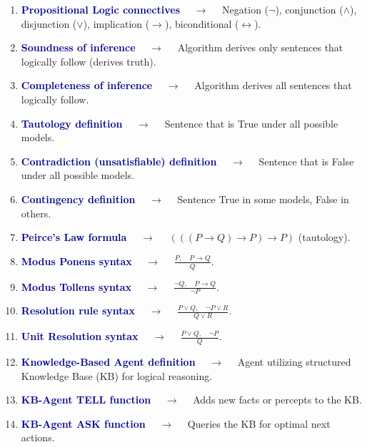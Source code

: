 \documentclass[11pt,a4paper]{article}
\begin{document}
\begin{enumerate}[label=\arabic*., leftmargin=*, labelsep=0.8em, itemsep=0.35em, parsep=0.1em, topsep=0.2em]
  \item \textcolor{darkblue}{\textbf{Propositional Logic connectives}} $\quad\to\quad$ Negation ($\neg$), conjunction ($\land$), disjunction ($\lor$), implication ($\rightarrow$), biconditional ($\leftrightarrow$).
  \item \textcolor{darkblue}{\textbf{Soundness of inference}} $\quad\to\quad$ Algorithm derives only sentences that logically follow (derives truth).
  \item \textcolor{darkblue}{\textbf{Completeness of inference}} $\quad\to\quad$ Algorithm derives all sentences that logically follow.
  \item \textcolor{darkblue}{\textbf{Tautology definition}} $\quad\to\quad$ Sentence that is True under all possible models.
  \item \textcolor{darkblue}{\textbf{Contradiction (unsatisfiable) definition}} $\quad\to\quad$ Sentence that is False under all possible models.
  \item \textcolor{darkblue}{\textbf{Contingency definition}} $\quad\to\quad$ Sentence True in some models, False in others.
  \item \textcolor{darkblue}{\textbf{Peirce's Law formula}} $\quad\to\quad$ $(((P \rightarrow Q) \rightarrow P) \rightarrow P)$ (tautology).
  \item \textcolor{darkblue}{\textbf{Modus Ponens syntax}} $\quad\to\quad$ $\frac{P, \quad P \rightarrow Q}{Q}$.
  \item \textcolor{darkblue}{\textbf{Modus Tollens syntax}} $\quad\to\quad$ $\frac{\neg Q, \quad P \rightarrow Q}{\neg P}$.
  \item \textcolor{darkblue}{\textbf{Resolution rule syntax}} $\quad\to\quad$ $\frac{P \lor Q, \quad \neg P \lor R}{Q \lor R}$.
  \item \textcolor{darkblue}{\textbf{Unit Resolution syntax}} $\quad\to\quad$ $\frac{P \lor Q, \quad \neg P}{Q}$.
  \item \textcolor{darkblue}{\textbf{Knowledge-Based Agent definition}} $\quad\to\quad$ Agent utilizing structured Knowledge Base (KB) for logical reasoning.
  \item \textcolor{darkblue}{\textbf{KB-Agent TELL function}} $\quad\to\quad$ Adds new facts or percepts to the KB.
  \item \textcolor{darkblue}{\textbf{KB-Agent ASK function}} $\quad\to\quad$ Queries the KB for optimal next actions.

\end{enumerate}
\end{document}
